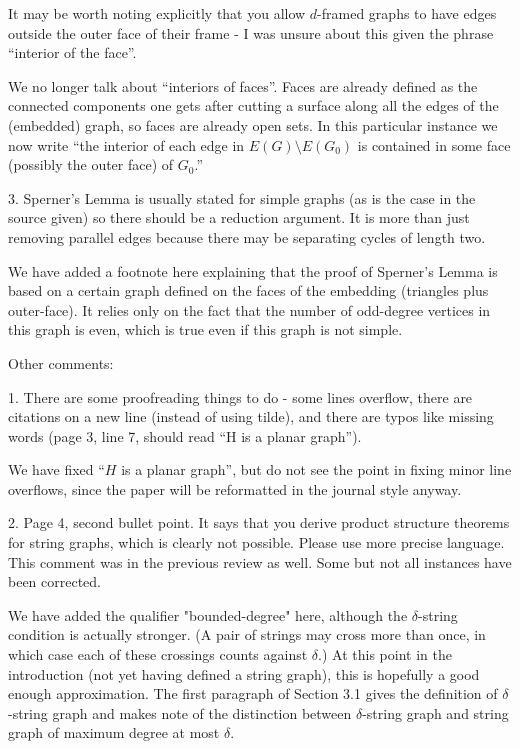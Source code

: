 \documentclass[12pt]{article}
\newenvironment{response}{\color{blue}}{}
\begin{document}
It may be worth noting explicitly that you allow $d$-framed graphs to
have edges outside the outer face of their frame - I was unsure about
this given the phrase “interior of the face”.

\begin{response}
  We no longer talk about ``interiors of faces''.  Faces are already defined as the connected components one gets after cutting a surface along all the edges of the (embedded) graph, so faces are already open sets.  In this particular instance we now write ``the interior of each edge in $E(G)\setminus E(G_0)$ is contained in some face (possibly the outer face) of $G_0$.''
\end{response}

3. Sperner’s Lemma is usually stated for simple graphs (as is the case
in the source given) so there should be a reduction argument. It is
more than just removing parallel edges because there may be separating
cycles of length two.

\begin{response}
  We have added a footnote here explaining that the proof of Sperner's Lemma is based on a certain graph defined on the faces of the embedding (triangles plus outer-face).  It relies only on the fact that the number of odd-degree vertices in this graph is even, which is true even if this graph is not simple.
\end{response}

Other comments:

1. There are some proofreading things to do - some lines overflow, there
are citations on a new line (instead of using tilde), and there are typos
like missing words (page 3, line 7, should read “H is a planar graph”).

\begin{response}
	We have fixed ``$H$ is a planar graph'', but do not see the point in fixing minor line overflows, since the paper will be reformatted in the journal style anyway.
\end{response}


2. Page 4, second bullet point. It says that you derive product structure
theorems for string graphs, which is clearly not possible. Please use
more precise language. This comment was in the previous review as
well. Some but not all instances have been corrected.

\begin{response}
  We have added the qualifier "bounded-degree" here, although the $\delta$-string condition is actually stronger.  (A pair of strings may cross more than once, in which case each of these crossings counts against $\delta$.)   At this point in the introduction (not yet having defined a string graph), this is hopefully a good enough approximation.  The first paragraph of Section 3.1 gives the definition of $\delta$-string graph and makes note of the distinction between $\delta$-string graph and string graph of maximum degree at most $\delta$.  
\end{response}
\end{document}
